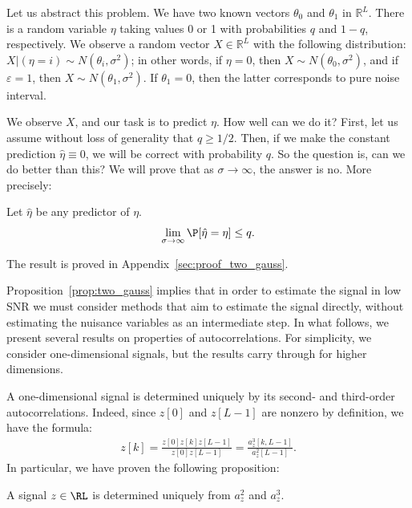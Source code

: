\documentclass[9pt,twocolumn,twoside,lineno]{pnas-new}
\begin{document}
Let us abstract this problem. We have two known vectors $\theta_0$ and $\theta_1$ in $\mathbb{R}^L$. There is a random variable $\eta$ taking values 0 or 1 with probabilities $q$ and $1-q$, respectively. We observe a random vector $X \in \mathbb{R}^L$ with the following distribution: $X | (\eta  = i) \sim N(\theta_i,\sigma^2)$; in other words, if $\eta = 0$, then $X \sim N(\theta_0,\sigma^2)$, and if $\varepsilon  = 1$, then $X \sim N(\theta_1,\sigma^2)$. If $\theta_1=0$, then the latter corresponds to pure noise interval.

We observe $X$, and our task is to predict $\eta$. How well can we do it? First, let us assume without loss of generality that $q \ge 1/2$. Then, if we make the constant prediction $\hat{\eta } \equiv 0$, we will be correct with probability $q$. So the question is, can we do better than this? We will prove that as $\sigma \to \infty$, the answer is no. More precisely:
\begin{proposition} \label{prop:two_gauss}
	Let $\hat{\eta }$ be any predictor of $\eta$.
	\begin{align*}
	\lim_{\sigma \to \infty} \P[ \hat{\eta} = \eta  ] \le q.
	\end{align*}
\end{proposition}
\noindent The result is proved in Appendix~\ref{sec:proof_two_gauss}.

Proposition~\ref{prop:two_gauss} implies that in order to estimate the signal in low SNR  we must consider methods that aim to estimate the signal directly, without estimating the nuisance variables as an intermediate step. 
  In what follows, we present several results on properties of autocorrelations. For simplicity, we consider one-dimensional signals, but the results carry through for higher dimensions. 

A one-dimensional signal is determined uniquely by its second- and third-order autocorrelations. Indeed, since $z[0]$ and $z[L-1]$ are nonzero by definition, we have the formula:
%
\begin{align} \label{eq-uniqueness}
%
z[k] = \frac{z[0]z[k]z[L-1]}{z[0]z[L-1]} = \frac{a_z^3[k,L-1]}{a_z^2[L-1]}.
%
\end{align}
In particular, we have proven the following proposition:
\begin{proposition} \label{prop:uniqueness}
	 A signal $z\in\RL$ is determined uniquely from  $a_z^2$ and $a_z^3$.
\end{proposition}
\end{document}
